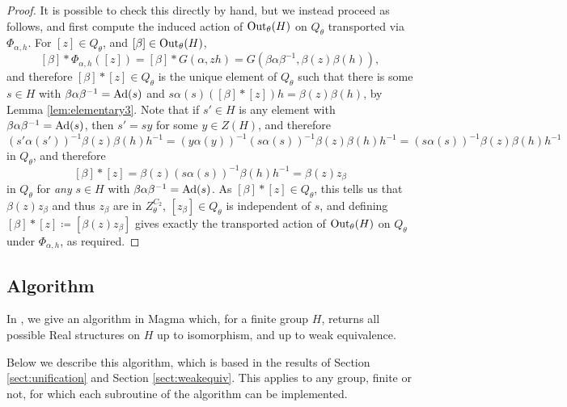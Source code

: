 \begin{proof}
  It is possible to check this directly by hand, but we instead proceed as follows, and first compute the induced action of $\operatorname{Out}_\theta(H)$ on $Q_{\theta}$ transported via $\Phi_{\alpha,h}$. For $[z] \in Q_{\theta}$, and $[\beta] \in \operatorname{Out}_{\theta}(H)$, 
  \[
  [\beta] * \Phi_{\alpha, h}([z]) = [\beta] * G(\alpha, zh) = G(\beta \alpha \beta^{-1}, \beta(z) \beta(h)),
  \]
  and therefore $[\beta] * [z] \in Q_{\theta}$ is the unique element of $Q_{\theta}$ such that there is some $s \in H$ with $\beta \alpha \beta^{-1} = \operatorname{Ad}(s)$ and $s \alpha(s) ([\beta] * [z]) h = \beta(z) \beta(h)$, by Lemma \ref{lem:elementary3}. Note that if $s' \in H$ is any element with $\beta \alpha \beta^{-1} = \operatorname{Ad}(s)$, then $s' = sy$ for some $y \in Z(H)$, and therefore
  \[
  (s' \alpha(s'))^{-1}\beta(z) \beta(h)h^{-1} = (y \alpha(y))^{-1} (s \alpha(s))^{-1}\beta(z) \beta(h)h^{-1} = (s \alpha(s))^{-1}\beta(z) \beta(h)h^{-1}
  \]
  in $Q_{\theta}$, and therefore 
  \[
  [\beta] * [z] = \beta(z) (s \alpha(s))^{-1} \beta(h) h^{-1} = \beta(z) z_{\beta}
  \]
  in $Q_{\theta}$ for \emph{any} $s \in H$ with $\beta \alpha \beta^{-1} = \operatorname{Ad}(s)$. As $[\beta] * [z] \in Q_{\theta}$, this tells us that $\beta(z) z_{\beta}$ and thus $z_{\beta}$ are in $Z_{\theta}^{C_2}$, $[z_{\beta}] \in Q_{\theta}$ is independent of $s$, and defining $[\beta]\ast[z]\coloneqq[\beta(z)z_\beta]$ gives exactly the transported action of $\operatorname{Out}_\theta(H)$ on $Q_{\theta}$ under $\Phi_{\alpha,h}$, as required.
\end{proof}

\subsection{Algorithm} In \cite{GITHUB}, we give an algorithm in Magma which, for a finite group $H$, returns all possible Real structures on $H$ up to isomorphism, and up to weak equivalence.

Below we describe this algorithm, which is based in the results of Section \ref{sect:unification} and Section \ref{sect:weakequiv}. This applies to any group, finite or not, for which each subroutine of the algorithm can be implemented.

